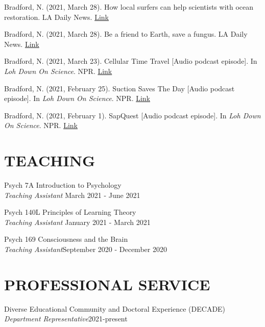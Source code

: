 \documentclass[margin, 10pt]{res} %
\begin{document}
\begin{resume}
Bradford, N. (2021, March 28). How local surfers can help scientists with ocean restoration. LA Daily News. \href{https://www.dailynews.com/2021/03/28/how-local-surfers-can-help-scientists-with-ocean-restoration/}{Link}

Bradford, N. (2021, March 28). Be a friend to Earth, save a fungus. LA Daily News. \href{https://www.dailynews.com/2021/03/28/be-a-friend-to-earth-save-a-fungus/}{Link}

Bradford, N. (2021, March 23). Cellular Time Travel [Audio podcast episode]. In {\sl Loh Down On Science}. NPR.  \href{https://lohdownonscience.com/cellular-time-travel/}{Link}

Bradford, N. (2021, February 25). Suction Saves The Day [Audio podcast episode]. In {\sl Loh Down On Science}. NPR.  \href{https://lohdownonscience.com/suction-saves-the-day/}{Link}

Bradford, N. (2021, February 1). SapQuest [Audio podcast episode]. In {\sl Loh Down On Science}. NPR.  \href{https://lohdownonscience.com/sapquest/}{Link}





\section{TEACHING}
Psych 7A Introduction to Psychology \\ 
{\sl Teaching Assistant} \hfill {March 2021 - June 2021}

Psych 140L Principles of Learning Theory \\ 
{\sl Teaching Assistant} \hfill {January 2021 - March 2021} 

Psych 169 Consciousness and the Brain \\
{\sl Teaching Assistant}\hfill {September 2020 - December 2020} 



\section{PROFESSIONAL SERVICE}

{Diverse Educational Community and Doctoral Experience (DECADE)} \\
{\sl Department Representative}\hfill 2021-present


\end{resume}
\end{document}
